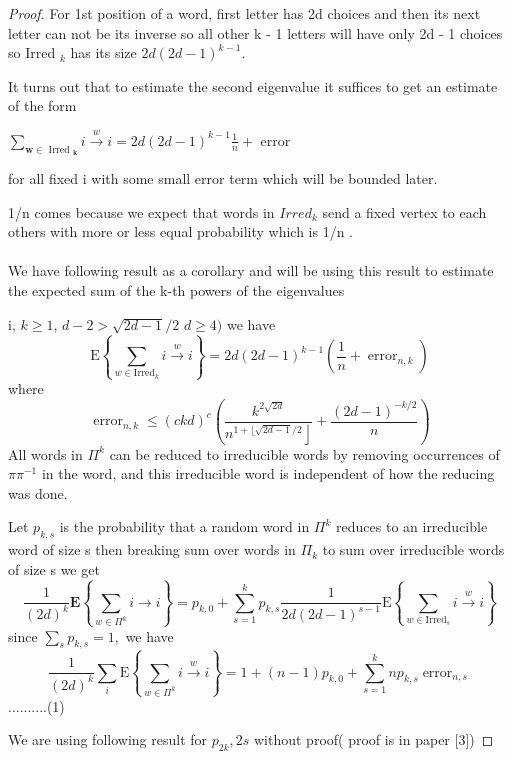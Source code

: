 \documentclass[oneside]{book}
\theoremstyle{definition}
\begin{document}
\begin{proof}
 For 1st position of a word, first letter has  2d choices and then its next letter can not be its inverse so all other k - 1 letters will have only 2d - 1 choices so
  Irred $_{k}$ has its  size $2 d(2 d-1)^{k-1} .$ \par 
  It turns out that to estimate the second eigenvalue it suffices
to get an estimate of the form
\begin{center}
   $\sum_{\boldsymbol{w} \in \text { Irred }_{\boldsymbol{k}}} i \stackrel{w}{\rightarrow} i=2 d(2 d-1)^{k-1} \frac{1}{n}+$ error 
\end{center}
for all fixed i with some small error term which will be bounded later.\par
 1/n comes because we expect  that words in $Irred_{k} $ send a fixed vertex to each  others with more or less equal probability which is 1/n . \\\\
We have following result as a corollary and will be using this result to estimate the expected sum of the k-th powers of the eigenvalues \par
  i, $k \geq 1$,  $d-2>\sqrt{2 d-1} / 2$  $d \geq 4)$ we have
$$
\mathrm{E}\left\{\sum_{w \in \mathrm{Irred}_{k}} i \stackrel{w}{\rightarrow} i\right\}=2 d(2 d-1)^{k-1}\left(\frac{1}{n}+\operatorname{error}_{n, k}\right)
$$
where
$$
\operatorname{error}_{n, k} \leq(c k d)^{c}\left(\frac{k^{2 \sqrt{2 d}}}{\left.n^{1+\lfloor\sqrt{2 d-1} / 2}\right\rfloor}+\frac{(2 d-1)^{-k / 2}}{n}\right)
$$
All words in $\Pi^{k}$ can be reduced to irreducible words by removing occurrences of $\pi \pi^{-1}$ in the word, and this irreducible word is independent of how the reducing was done. \par 
Let  $p_{k,s}$ is the probability that a random word in  $\Pi^{k}$ reduces to an irreducible word of size s then breaking sum over words in  $\Pi_k$ to sum over irreducible words of size s  we get  
$$
\frac{1}{(2 d)^{k}} \mathbf{E}\left\{\sum_{w \in \Pi^{k}} i\rightarrow i\right\}=p_{k, 0}+\sum_{s=1}^{k} p_{k, s} \frac{1}{2 d(2 d-1)^{s-1}} \mathrm{E}\left\{\sum_{w \in \mathrm{Irred}_{s}} i \stackrel{w}{\rightarrow} i\right\}
$$
  since $\sum_{s} p_{k, s}=1,$ we have
$$ 
\frac{1}{(2 d)^{k}} \sum_{i} \mathrm{E}\left\{\sum_{w \in \Pi^{k}} i \stackrel{w}{\rightarrow} i\right\}=1+(n-1) p_{k, 0}+\sum_{s=1}^{k} n p_{k, s} \operatorname{error}_{n, s} 
$$    ..........(1)\par
We are using following result for $p_{2k},{2s}$ without proof( proof is in paper [3])  \par

\end{proof}
\end{document}
